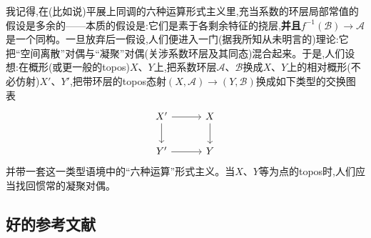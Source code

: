 
我记得,在(比如说)平展上同调的六种运算形式主义里,充当系数的环层局部常值的假设是多余的——本质的假设是:它们是素于各剩余特征的挠层,\textbf{并且}$f^{-1}(\mathcal{B})\to\mathcal{A}$是一个同构。一旦放弃后一假设,人们便进入一门(据我所知从未明言的)理论:它把“空间离散”对偶与“凝聚”对偶(关涉系数环层及其同态)混合起来。于是,人们设想:在概形(或更一般的topos)$X$、$Y$上,把系数环层$\mathcal{A}$、$\mathcal{B}$换成$X$、$Y$上的相对概形(不必仿射)$X'$、$Y'$,把带环层的topos态射\dmark{}$(X,\mathcal{A})\to(Y,\mathcal{B})$换成如下类型的交换图表
\[
\begin{tikzcd}[row sep=2em, column sep=3em]
X' \arrow[r] \arrow[d] & X \arrow[d] \\
Y' \arrow[r] & Y
\end{tikzcd}
\]
并带一套这一类型语境中的“六种运算”形式主义。当$X$、$Y$等为点的topos时,人们应当找回惯常的凝聚对偶。

\subsection{好的参考文献}


